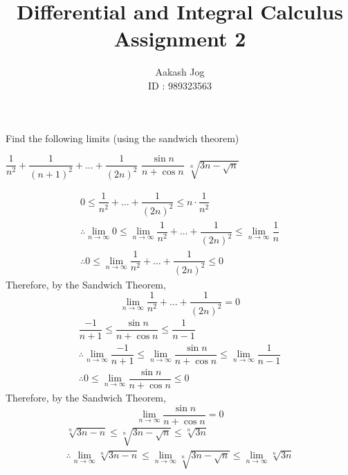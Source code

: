 \documentclass[fleqn, a4paper, 12pt, oneside]{amsart}
\title
{
	Differential and Integral Calculus\\
	Assignment 2
}
\author
{
	Aakash Jog\\
	ID : 989323563
}
\date{\formatdate{26}{3}{2015}}
\theoremstyle{definition}
\theoremstyle{theorem}
\begin{document}
	
\maketitle

\begin{question} %
	Find the following limits (using the sandwich theorem)
	\begin{tasks}
		\task $\dfrac{1}{n^2} + \dfrac{1}{(n + 1)^2} + \dots + \dfrac{1}{(2n)^2}$
		\task $\dfrac{\sin n}{n + \cos n}$
		\task $\sqrt[n]{3n - \sqrt{n}}$
	\end{tasks}
\end{question}

\begin{solution}
	\begin{tasks}
		\task
			\begin{gather*}
				0 \le \dfrac{1}{n^2} + \dots + \dfrac{1}{(2n)^2} \le n \cdot \dfrac{1}{n^2}\\
				\therefore \lim\limits_{n \to \infty} 0 \le \lim\limits_{n \to \infty} \dfrac{1}{n^2} + \dots + \dfrac{1}{(2n)^2} \le \lim\limits_{n \to \infty} \dfrac{1}{n}\\
				\therefore 0 \le \lim\limits_{n \to \infty} \dfrac{1}{n^2} + \dots + \dfrac{1}{(2n)^2} \le 0
			\end{gather*}
			Therefore, by the Sandwich Theorem,
			\begin{equation*}
				\lim\limits_{n \to \infty} \dfrac{1}{n^2} + \dots + \dfrac{1}{(2n)^2} = 0
			\end{equation*}
		\task
			\begin{gather*}
				\dfrac{-1}{n + 1} \le \dfrac{\sin n}{n + \cos n} \le \dfrac{1}{n - 1}\\
				\therefore \lim\limits_{n \to \infty} \dfrac{-1}{n + 1} \le \lim\limits_{n \to \infty} \dfrac{\sin n}{n + \cos n} \le \lim\limits_{n \to \infty} \dfrac{1}{n - 1}\\
				\therefore 0 \le \lim\limits_{n \to \infty} \dfrac{\sin n}{n + \cos n} \le 0
			\end{gather*}
			Therefore, by the Sandwich Theorem,
			\begin{equation*}
				\lim\limits_{n \to \infty}  \dfrac{\sin n}{n + \cos n} = 0
			\end{equation*}
		\task
			\begin{gather*}
				\sqrt[n]{3n - n} \le \sqrt[n]{3n - \sqrt{n}} \le \sqrt[n]{3n}\\
				\therefore \lim\limits_{n \to \infty} \sqrt[n]{3n - n} \le \lim\limits_{n \to \infty} \sqrt[n]{3n - \sqrt{n}} \le \lim\limits_{n \to \infty} \sqrt[n]{3n}\\

\end{gather*}
\end{tasks}
\end{solution}
\end{document}
